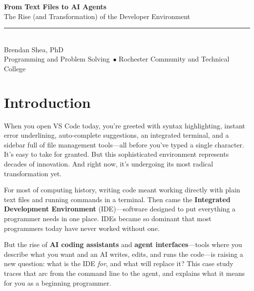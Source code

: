 \documentclass[11pt,letterpaper]{article}
\newcommand{\cstitle}{From Text Files to AI Agents}
\newcommand{\cssubtitle}{The Rise (and Transformation) of the Developer Environment}
\newcommand{\csauthor}{Brendan Shea, PhD}
\newcommand{\cscourse}{Programming and Problem Solving}
\newcommand{\csinstitution}{Rochester Community and Technical College}
\newcommand{\keyterm}[1]{\textbf{\textcolor{cssecondary}{#1}}}
\begin{document}
\begin{tcolorbox}[
    enhanced,
    colback=csprimary,
    colframe=csprimary,
    arc=0mm,
    left=10mm, right=10mm, top=8mm, bottom=8mm
]
\begin{center}
    {\huge\bfseries\color{white}\cstitle}\\[3mm]
    {\Large\color{cslight}\cssubtitle}\\[5mm]
    \textcolor{cssecondary}{\rule{0.5\textwidth}{1pt}}\\[5mm]
    {\large\color{white}\csauthor}\\[2mm]
    {\normalsize\color{cslight}\cscourse\ $\bullet$ \csinstitution}
\end{center}
\end{tcolorbox}

\vspace{5mm}

\section*{Introduction}

When you open VS Code today, you're greeted with syntax highlighting, instant error underlining, auto-complete suggestions, an integrated terminal, and a sidebar full of file management tools---all before you've typed a single character. It's easy to take for granted. But this sophisticated environment represents decades of innovation. And right now, it's undergoing its most radical transformation yet.

For most of computing history, writing code meant working directly with plain text files and running commands in a terminal. Then came the \keyterm{Integrated Development Environment} (IDE)---software designed to put everything a programmer needs in one place. IDEs became so dominant that most programmers today have never worked without one.

But the rise of \keyterm{AI coding assistants} and \keyterm{agent interfaces}---tools where you describe what you want and an AI writes, edits, and runs the code---is raising a new question: what is the IDE \textit{for}, and what will replace it? This case study traces that arc from the command line to the agent, and explains what it means for you as a beginning programmer.
\end{document}
